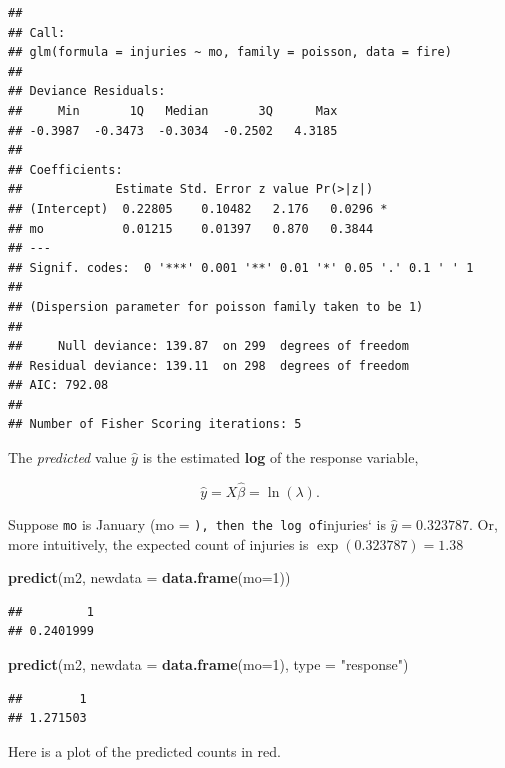 \documentclass[
]{book}
\newenvironment{Shaded}{\begin{snugshade}}{\end{snugshade}}
\newcommand{\DataTypeTok}[1]{\textcolor[rgb]{0.13,0.29,0.53}{#1}}
\newcommand{\DecValTok}[1]{\textcolor[rgb]{0.00,0.00,0.81}{#1}}
\newcommand{\KeywordTok}[1]{\textcolor[rgb]{0.13,0.29,0.53}{\textbf{#1}}}
\newcommand{\NormalTok}[1]{#1}
\newcommand{\StringTok}[1]{\textcolor[rgb]{0.31,0.60,0.02}{#1}}
\begin{document}
\begin{verbatim}
## 
## Call:
## glm(formula = injuries ~ mo, family = poisson, data = fire)
## 
## Deviance Residuals: 
##     Min       1Q   Median       3Q      Max  
## -0.3987  -0.3473  -0.3034  -0.2502   4.3185  
## 
## Coefficients:
##             Estimate Std. Error z value Pr(>|z|)  
## (Intercept)  0.22805    0.10482   2.176   0.0296 *
## mo           0.01215    0.01397   0.870   0.3844  
## ---
## Signif. codes:  0 '***' 0.001 '**' 0.01 '*' 0.05 '.' 0.1 ' ' 1
## 
## (Dispersion parameter for poisson family taken to be 1)
## 
##     Null deviance: 139.87  on 299  degrees of freedom
## Residual deviance: 139.11  on 298  degrees of freedom
## AIC: 792.08
## 
## Number of Fisher Scoring iterations: 5
\end{verbatim}

The \emph{predicted} value \(\hat{y}\) is the estimated \textbf{log} of the response variable,

\[\hat{y} = X \hat{\beta} = \ln (\lambda).\]

Suppose \texttt{mo} is January (mo = \texttt{),\ then\ the\ log\ of}injuries` is \(\hat{y} = 0.323787\). Or, more intuitively, the expected count of injuries is \(\exp(0.323787) = 1.38\)

\begin{Shaded}
\begin{Highlighting}[]
\KeywordTok{predict}\NormalTok{(m2, }\DataTypeTok{newdata =} \KeywordTok{data.frame}\NormalTok{(}\DataTypeTok{mo=}\DecValTok{1}\NormalTok{))}
\end{Highlighting}
\end{Shaded}

\begin{verbatim}
##         1 
## 0.2401999
\end{verbatim}

\begin{Shaded}
\begin{Highlighting}[]
\KeywordTok{predict}\NormalTok{(m2, }\DataTypeTok{newdata =} \KeywordTok{data.frame}\NormalTok{(}\DataTypeTok{mo=}\DecValTok{1}\NormalTok{), }\DataTypeTok{type =} \StringTok{"response"}\NormalTok{)}
\end{Highlighting}
\end{Shaded}

\begin{verbatim}
##        1 
## 1.271503
\end{verbatim}

Here is a plot of the predicted counts in red.
\end{document}
